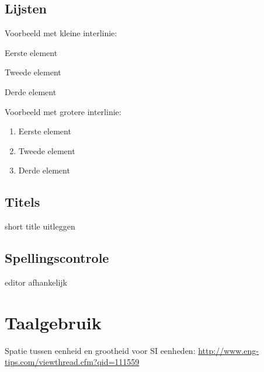 \subsection{Lijsten}

Voorbeeld met kleine interlinie:

\begin{enumerate*}
 \item Eerste element
 \item Tweede element
 \item Derde element
\end{enumerate*}

Voorbeeld met grotere interlinie:

\begin{enumerate}
 \item Eerste element
 \item Tweede element
 \item Derde element
\end{enumerate}


\subsection{Titels}

short title uitleggen

\subsection{Spellingscontrole}

editor afhankelijk

\section{Taalgebruik}

Spatie tussen eenheid en grootheid voor SI eenheden: \url{http://www.eng-tips.com/viewthread.cfm?qid=111559}
